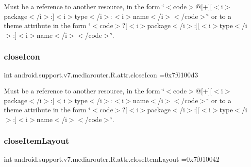 Must be a reference to another resource, in the form \char`\"{}$<$code$>$@\mbox{[}+\mbox{]}\mbox{[}$<$i$>$package$<$/i$>$\+:\mbox{]}$<$i$>$type$<$/i$>$\+:$<$i$>$name$<$/i$>$$<$/code$>$\char`\"{} or to a theme attribute in the form \char`\"{}$<$code$>$?\mbox{[}$<$i$>$package$<$/i$>$\+:\mbox{]}\mbox{[}$<$i$>$type$<$/i$>$\+:\mbox{]}$<$i$>$name$<$/i$>$$<$/code$>$\char`\"{}. \mbox{\label{classandroid_1_1support_1_1v7_1_1mediarouter_1_1R_1_1attr_a76b39c93a184c1a2483ee9999d1613db}} 
\subsubsection{\texorpdfstring{close\+Icon}{closeIcon}}
{\footnotesize\ttfamily int android.\+support.\+v7.\+mediarouter.\+R.\+attr.\+close\+Icon =0x7f0100d3\hspace{0.3cm}{\ttfamily [static]}}

Must be a reference to another resource, in the form \char`\"{}$<$code$>$@\mbox{[}+\mbox{]}\mbox{[}$<$i$>$package$<$/i$>$\+:\mbox{]}$<$i$>$type$<$/i$>$\+:$<$i$>$name$<$/i$>$$<$/code$>$\char`\"{} or to a theme attribute in the form \char`\"{}$<$code$>$?\mbox{[}$<$i$>$package$<$/i$>$\+:\mbox{]}\mbox{[}$<$i$>$type$<$/i$>$\+:\mbox{]}$<$i$>$name$<$/i$>$$<$/code$>$\char`\"{}. \mbox{\label{classandroid_1_1support_1_1v7_1_1mediarouter_1_1R_1_1attr_aff5cf12989d6d01a668c3b60293a0e02}} 
\subsubsection{\texorpdfstring{close\+Item\+Layout}{closeItemLayout}}
{\footnotesize\ttfamily int android.\+support.\+v7.\+mediarouter.\+R.\+attr.\+close\+Item\+Layout =0x7f010042\hspace{0.3cm}{\ttfamily [static]}}

